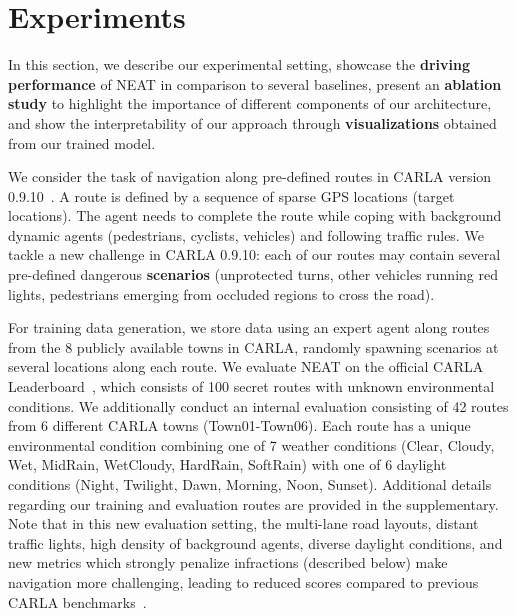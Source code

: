 \section{Experiments}
\label{sec:results}

In this section, we describe our experimental setting, showcase the \textbf{driving performance} of NEAT in comparison to several baselines, present an \textbf{ablation study} to highlight the importance of different components of our architecture, and show the interpretability of our approach through \textbf{visualizations} obtained from our trained model.

We consider the task of navigation along pre-defined routes in CARLA version 0.9.10~\cite{Dosovitskiy2017CORL}. A route is defined by a sequence of sparse GPS locations (target locations). The agent needs to complete the route while coping with background dynamic agents (pedestrians, cyclists, vehicles) and following traffic rules. We tackle a new challenge in CARLA 0.9.10: each of our routes may contain several pre-defined dangerous \textbf{scenarios} (\eg unprotected turns, other vehicles running red lights, pedestrians emerging from occluded regions to cross the road).

For training data generation, we store data using an expert agent along routes from the 8 publicly available towns in CARLA, randomly spawning scenarios at several locations along each route. We evaluate NEAT on the official CARLA Leaderboard~\cite{Leaderboard}, which consists of 100 secret routes with unknown environmental conditions. We additionally conduct an internal evaluation consisting of 42 routes from 6 different CARLA towns (Town01-Town06). Each route has a unique environmental condition combining one of 7 weather conditions (Clear, Cloudy, Wet, MidRain, WetCloudy, HardRain, SoftRain) with one of 6 daylight conditions (Night, Twilight, Dawn, Morning, Noon, Sunset). Additional details regarding our training and evaluation routes are provided in the supplementary. Note that in this new evaluation setting, the multi-lane road layouts, distant traffic lights, high density of background agents, diverse daylight conditions, and new metrics which strongly penalize infractions (described below) make navigation more challenging, leading to reduced scores compared to previous CARLA benchmarks~\cite{Dosovitskiy2017CORL,Codevilla2019ICCV}.

